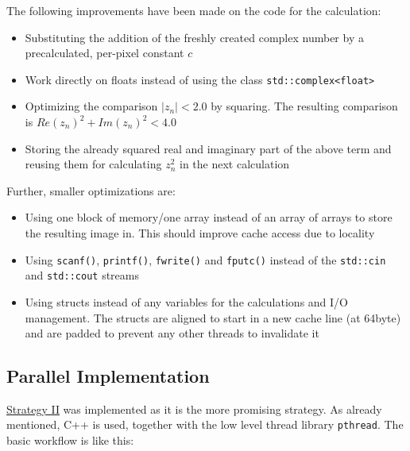 The following improvements have been made on the code for the \ms{} calculation:
\begin{itemize}
    \item Substituting the addition of the freshly created complex number by a precalculated, per-pixel constant $c$
    \item Work directly on floats instead of using the class \verb|std::complex<float>|
    \item Optimizing the comparison $|z_n| < 2.0$ by squaring. The resulting comparison is $Re(z_n)^2 + Im(z_n)^2 < 4.0$
    \item Storing the already squared real and imaginary part of the above term and reusing them for calculating $z_n^2$ in the next calculation
\end{itemize}

Further, smaller optimizations are:
\begin{itemize}
    \item Using one block of memory/one array instead of an array of arrays to store the resulting image in. This should improve cache access due to locality
    \item Using \verb$scanf()$, \verb$printf()$, \verb$fwrite()$ and \verb$fputc()$ instead of the \verb$std::cin$ and \verb$std::cout$ streams
    \item Using structs instead of any variables for the calculations and I/O management. The structs are aligned to start in a new cache line (at 64byte) and are padded to prevent any other threads to invalidate it
\end{itemize}


\subsection{Parallel Implementation}
\label{ssec:parallel_implementation}

\hyperref[ssec:strategy-ii]{Strategy II} was implemented as it is the more promising strategy. As already mentioned, C++ is used, together with the low level thread library \verb$pthread$. The basic workflow is like this:

